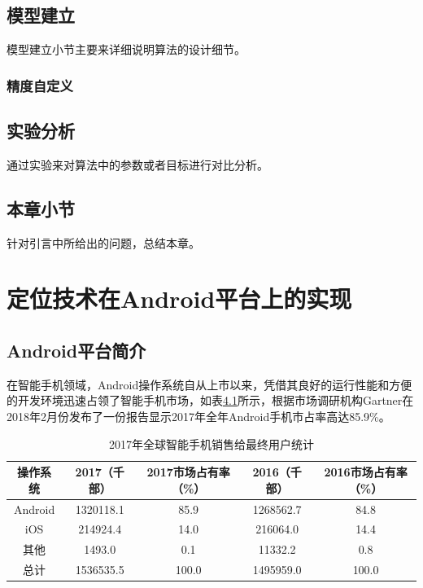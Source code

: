 \section{模型建立}

模型建立小节主要来详细说明算法的设计细节。

\subsection{精度自定义}



\section{实验分析}

通过实验来对算法中的参数或者目标进行对比分析。

\section{本章小节}

针对引言中所给出的问题，总结本章。




\chapter{定位技术在Android平台上的实现}

\section{Android平台简介}

在智能手机领域，Android操作系统自从上市以来，凭借其良好的运行性能和方便的开发环境迅速占领了智能手机市场，如表\ref{tab-61}所示，根据市场调研机构Gartner在2018年2月份发布了一份报告显示2017年全年Android手机市占率高达85.9\%\cite{gartner-smartphone-2017}。


\begin{table} [thb]
	\caption{2017年全球智能手机销售给最终用户统计}\label{tab-61}
	\small
	\centering
	{
		\begin{tabular}{c c c c c}
			\toprule
			操作系统 & 2017（千部） & 2017市场占有率（\%） & 2016（千部） & 2016市场占有率（\%）\\
			\midrule
			Android & 1320118.1 & 85.9 & 1268562.7 & 84.8\\
			iOS & 214924.4 & 14.0 & 216064.0 & 14.4\\
			其他 & 1493.0 & 0.1 & 11332.2 & 0.8\\
			总计 & 1536535.5 & 100.0 & 1495959.0 & 100.0\\			
			\bottomrule
		\end{tabular}
	}
\end{table}


